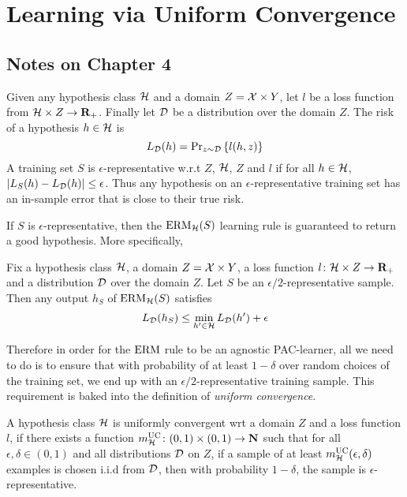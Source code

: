 \chapter{Learning via Uniform Convergence}

\section*{Notes on Chapter 4}

Given any hypothesis class $\mathcal{H}$ and a domain $Z = \mathcal{X} \times Y$, let
$l$ be a loss function from $\mathcal{H} \times Z \rightarrow \mathbf{R}_{+}$. Finally let
$\mathcal{D}$ be a distribution over the domain $Z$. The risk of a hypothesis $h \in
\mathcal{H}$ is
\[
    L_{\mathcal{D}}(h) = \text{Pr}_{z \sim \mathcal{D}} \left \{ l(h, z) \right \}
\]
A training set $S$ is $\epsilon$-representative w.r.t $Z$, $\mathcal{H}$, $Z$ and
$l$ if for all $h \in \mathcal{H}$, $|L_S (h) - L_{\mathcal{D}} (h)| \leq \epsilon$.
Thus any hypothesis on an $\epsilon$-representative training set has an
in-sample error that is close to their true risk. 

If $S$ is $\epsilon$-representative, then the $\operatorname{ERM}_{\mathcal{H}}(S)$ learning
rule is guaranteed to return a good hypothesis. More specifically,
\begin{lemma}
\label{lemma:epsilon_representative}
Fix a hypothesis class $\mathcal{H}$, a domain $Z = \mathcal{X} \times Y$, a loss 
function $l \colon \mathcal{H} \times Z \rightarrow \mathbf{R}_{+}$ and a distribution
$\mathcal{D}$ over the domain $Z$. Let $S$ be an $\epsilon/2$-representative sample. 
Then any output $h_S$ of $\operatorname{ERM}_{\mathcal{H}}(S)$ satisfies 
\[
    L_{\mathcal{D}} (h_S) \leq \min_{h' \in \mathcal{H}} L_{\mathcal{D}}(h') + \epsilon 
\]
\end{lemma}

Therefore in order for the $\operatorname{ERM}$ rule to be an agnostic PAC-learner, all we
need to do is to ensure that with probability of at least $1 - \delta$ over
random choices of the training set, we end up with an
$\epsilon/2$-representative training sample. This requirement is baked into 
the definition of \emph{uniform convergence}. 

\begin{definition}
A hypothesis class $\mathcal{H}$ is uniformly convergent wrt a domain $Z$ 
and a loss function $l$, if there exists a function 
$m_{\mathcal{H}}^{\text{UC}} \colon (0, 1) \times (0, 1) \rightarrow \mathbf{N}$ such that 
for all $\epsilon, \delta \in (0, 1)$ and all distributions $\mathcal{D}$ on $Z$,
if a sample of at least $m_{\mathcal{H}}^{\text{UC}}(\epsilon, \delta)$ examples is chosen
i.i.d from $\mathcal{D}$, then with probability $1 - \delta$, the sample is 
$\epsilon$-representative.   
\end{definition}

